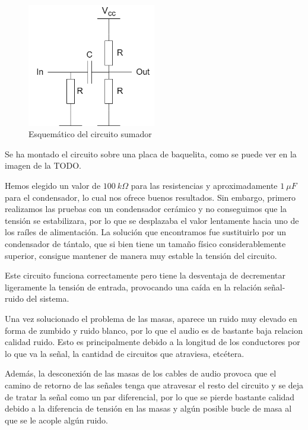 \begin{figure}[h]
    \centering
    \includegraphics[width=0.5\textwidth]{images/2/2-6/sumadorEsquematico.png}
    \caption{Esquemático del circuito sumador}
    \label{fig:2-6-sumador}
\end{figure}

Se ha montado el circuito sobre una placa de baquelita, como se puede ver en la imagen de la TODO.\ 


Hemos elegido un valor de $100\ k\Omega$ para las resistencias y aproximadamente $1\ \mu F$ para el condensador, lo cual nos ofrece buenos resultados. Sin embargo, primero realizamos las pruebas con un condensador cerámico y no conseguimos que la tensión se estabilizara, por lo que se desplazaba el valor lentamente hacia uno de los raíles de alimentación. La solución que encontramos fue sustituirlo por un condensador de tántalo, que si bien tiene un tamaño físico considerablemente superior, consigue mantener de manera muy estable la tensión del circuito.

Este circuito funciona correctamente pero tiene la desventaja de decrementar ligeramente la tensión de entrada, provocando una caída en la relación señal-ruido del sistema.

Una vez solucionado el problema de las masas, aparece un ruido muy elevado en forma de zumbido y ruido blanco, por lo que el audio es de bastante baja relacion calidad ruido. Esto es principalmente debido a la longitud de los conductores por lo que va la señal, la cantidad de circuitos que atraviesa, etcétera. 

Además, la desconexión de las masas de los cables de audio provoca que el camino de retorno de las señales tenga que atravesar el resto del circuito y se deja de tratar la señal como un par diferencial, por lo que se pierde bastante calidad debido a la diferencia de tensión en las masas y algún posible bucle de masa al que se le acople algún ruido.

